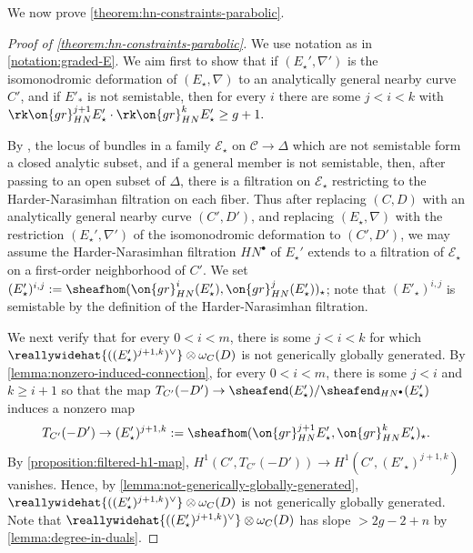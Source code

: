 \subsubsection{}
We now prove \autoref{theorem:hn-constraints-parabolic}.
\label{subsection:proof-hn}
\begin{proof}[Proof of \autoref{theorem:hn-constraints-parabolic}]
We use notation as in \autoref{notation:graded-E}.  We aim first to show that if $(E_\star',
\nabla')$ is the isomonodromic deformation of $(E_\star, \nabla)$ to
an analytically
general nearby curve $C'$, and if $E'_*$ is not semistable, then for every $i$ there are some $j < i < k$ with
$\rk \on{gr}^{j+1}_{HN}E_\star'\cdot \rk \on{gr}^k_{HN}E_\star'\geq g+1.$

By \cite[Lemma 5.1]{BHH:irregular},
the locus of bundles in a family $\mathscr E_\star$ on $\mathscr C \to \Delta$
which are not semistable form a closed analytic subset,
and if a general member is not semistable, then, after passing to an open subset
of $\Delta$, there is a filtration on $\mathscr E_\star$ restricting to the
Harder-Narasimhan filtration on each fiber. Thus after replacing $(C,D)$ with an
analytically general nearby curve $(C',D')$, and replacing $(E_\star,
\nabla)$ with
the restriction $(E_\star', \nabla')$ of the isomonodromic deformation to $(C',D')$,
we may assume the Harder-Narasimhan filtration $HN^\bullet$ of $E_\star'$ extends to a filtration of $\mathscr{E_\star}$ on a first-order neighborhood of $C'$. We set $(E'_\star)^{i,j} :=
\sheafhom(\on{gr}^i_{HN}(E'_\star),\on{gr}^{j}_{HN}(E'_\star))_\star$; note that $(E'_\star)^{i,j}$ is semistable by the definition of the Harder-Narasimhan filtration.

We next verify that for every $0 < i < m$, there is some $j < i < k$ for which
$\reallywidehat{((E'_\star)^{j+1,k})^\vee} \otimes \omega_C(D)$ is not generically globally generated.
By \autoref{lemma:nonzero-induced-connection},
for every $0 < i < m$,
there is some $j < i$ and $k \geq i+1$ so that the map $T_{C'}(-D') \to
\sheafend(E_\star')/\sheafend_{HN^\bullet}(E_\star')$
induces a nonzero map
$$T_{C'}(-D') \to (E'_\star)^{j+1,k}:=\sheafhom(\on{gr}^{j+1}_{HN}E_\star', \on{gr}^k_{HN} E_\star')_\star.$$
By \autoref{proposition:filtered-h1-map},
$H^1(C', T_{C'}(-D')) \to
H^1(C', (E'_\star)^{j+1,k})$ vanishes.
Hence, by
\autoref{lemma:not-generically-globally-generated},
$\reallywidehat{((E'_\star)^{j+1,k})^\vee} \otimes \omega_C(D)$
is not generically globally generated. Note that
$\reallywidehat{((E'_\star)^{j+1,k})^\vee} \otimes \omega_C(D)$
has slope $> 2g - 2 + n$ by \autoref{lemma:degree-in-duals}.


\end{proof}
